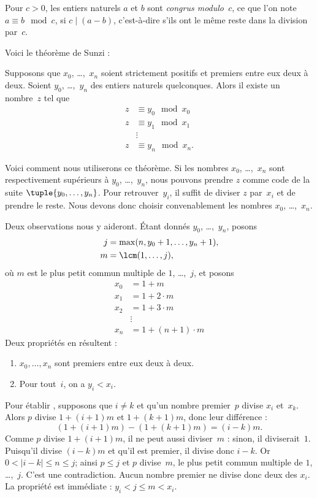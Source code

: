 \documentclass[../../../include/open-logic-section]{subfiles}
\begin{document}
\begin{defn}
Pour $c>0$, les entiers naturels $a$ et $b$ sont
\emph{congrus modulo~$c$},
ce que l'on note $a\equiv b\mod c$, si $c\mid(a-b)$, c'est-à-dire
s'ils ont le même reste dans la division par~$c$.
\end{defn}

Voici le théorème de Sunzi :
\begin{thm}
Supposons que $x_0$, \dots,~$x_n$ soient strictement positifs et
premiers entre eux deux
à deux. Soient $y_0$, \dots,~$y_n$ des entiers naturels quelconques.
Alors il existe un nombre~$z$ tel que
\begin{align*}
z & \equiv y_0 \mod x_0 \\
z & \equiv y_1 \mod x_1 \\
& \vdots  \\
z & \equiv y_n \mod x_n.
\end{align*}
\end{thm}

Voici comment nous utiliserons ce théorème. Si les nombres $x_0$,
\dots,~$x_n$ sont respectivement supérieurs à $y_0$,
\dots,~$y_n$, nous pouvons prendre $z$ comme code de la suite
$\tuple{y_0,\dots,y_n}$. Pour retrouver~$y_i$, il suffit de
diviser $z$ par~$x_i$ et de prendre le reste. Nous devons donc
choisir convenablement les nombres $x_0$, \dots,~$x_n$.

Deux observations nous y aideront. Étant donnés
$y_0$, \dots,~$y_n$, posons
\begin{align*}
j &= \max(n, y_0 + 1, \dots, y_n + 1), \\
m &= \lcm(1,\dots,j),
\end{align*}
où $m$ est le plus petit commun multiple de $1$, \dots,~$j$, et
posons
\begin{align*}
x_0 & = 1 + m \\
x_1 & = 1 + 2 \cdot m \\
x_2 & = 1 + 3 \cdot m \\
& \vdots  \\
x_n & = 1 + (n+1) \cdot m
\end{align*}
Deux propriétés en résultent :
\begin{enumerate}
\item{} $x_0,\dots,x_n$ sont premiers entre eux deux à deux.
\item{} Pour tout~$i$, on a $y_i<x_i$.
\end{enumerate}
Pour établir , supposons que $i\neq k$ et qu'un
nombre premier~$p$ divise $x_i$ et~$x_k$. Alors $p$ divise
$1+(i+1)m$ et $1+(k+1)m$, donc leur différence :
\[
(1 + (i+1)m) - (1+ (k+1)m) = (i-k) m.
\]
Comme $p$ divise $1+(i+1)m$, il ne peut aussi diviser~$m$ :
sinon, il diviserait~$1$. Puisqu'il divise $(i-k)m$ et qu'il
est premier, il divise donc $i-k$. Or $0<|i-k|\le n\le j$;
ainsi $p\le j$ et $p$ divise~$m$, le plus petit commun multiple
de $1$, \dots,~$j$. C'est une contradiction. Aucun nombre
premier ne divise donc deux des $x_i$. La propriété
 est immédiate : $y_i<j\le m<x_i$.
\end{document}

